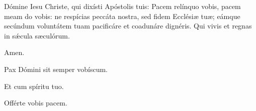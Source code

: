 Dómine Iesu Christe, qui dixísti Apóstolis tuis: Pacem relínquo vobis, pacem meam do vobis: ne respícias peccáta nostra, sed fidem Ecclésiæ tuæ; eámque secúndum voluntátem tuam pacificáre et coadunáre dignéris. Qui vivis et regnas in sǽcula sæculórum.

\Rbardot{} Amen.

\Vbardot{} Pax Dómini sit semper vobíscum.

\Rbardot{} Et cum spíritu tuo.

\Vbardot{} Offérte vobis pacem.


